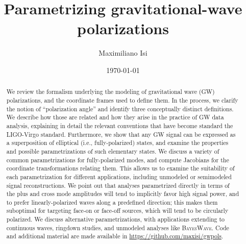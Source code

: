 \documentclass[aps,prd,twocolumn,superscriptaddress,preprintnumbers,floatfix,nofootinbib]{revtex4-2}
\newcommand{\dcc}{LIGO-P2200221}
\begin{document}

\title{Parametrizing gravitational-wave polarizations}

\author{Maximiliano Isi}




\date{\today}

\begin{abstract}
We review the formalism underlying the modeling of gravitational wave (GW) polarizations, and the coordinate frames used to define them.
In the process, we clarify the notion of ``polarization angle'' and identify three conceptually distinct definitions.
We describe how those are related and how they arise in the practice of GW data analysis, explaining in detail the relevant conventions that have become standard the LIGO-Virgo standard.
Furthermore, we show that any GW signal can be expressed as a superposition of elliptical (i.e., fully-polarized) states, and examine the properties and possible parametrizations of such elementary states.
We discuss a variety of common parametrizations for fully-polarized modes, and compute Jacobians for the coordinate transformations relating them.
This allows us to examine the suitability of each parametrization for different applications, including unmodeled or semimodeled signal reconstructions.
We point out that analyses parametrized directly in terms of the plus and cross mode amplitudes will tend to implicitly favor high signal power, and to prefer linearly-polarized waves along a predefined direction; this makes them suboptimal for targeting face-on or face-off sources, which will tend to be circularly polarized.
We discuss alternative parametrizations, with applications extending to continuous waves, ringdown studies, and unmodeled analyses like \textsc{BayesWave}.
Code and additional material are made available in \url{https://github.com/maxisi/gwpols}.
\end{abstract}
\end{document}
